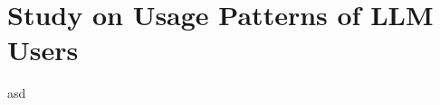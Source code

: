 \section{Study on Usage Patterns of LLM Users}
\label{sec:study-on-usage-patterns-of-llm-users}

asd


%